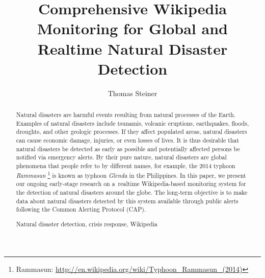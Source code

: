 \documentclass[runningheads,a4paper]{llncs}
\newcommand{\keywords}[1]{\par\addvspace\baselineskip
\noindent\keywordname\enspace\ignorespaces#1}
\begin{document}
\mainmatter  %

\title{Comprehensive Wikipedia Monitoring for Global and Realtime Natural Disaster Detection}


\author{
  Thomas Steiner
}
%


\maketitle

\begin{abstract}
Natural disasters are harmful events
resulting from natural processes of the Earth.
Examples of natural disasters include tsunamis,
volcanic eruptions, earthquakes, floods, droughts,
and other geologic processes.
If they affect populated areas, natural disasters
can cause economic damage, injuries, or even losses of lives.
It is thus desirable that natural disasters
be detected as early as possible
and potentially affected persons be notified via emergency alerts.
By their pure nature, natural disasters are global phenomena
that people refer to by different names,
for example, the 2014 typhoon \emph{Rammasun}%
\footnote{Rammasun:
\url{http://en.wikipedia.org/wiki/Typhoon_Rammasun_(2014)}}
is known as typhoon \emph{Glenda} in the Philippines.
In this paper, we present our ongoing early-stage research
on a~realtime Wikipedia-based monitoring system
for the detection of natural disasters around the globe.
The long-term objective is to make data about natural disasters 
detected by this system available through public alerts
following the Common Alerting Protocol (CAP).

\keywords{Natural disaster detection, crisis response, Wikipedia}
\end{abstract}
\end{document}
